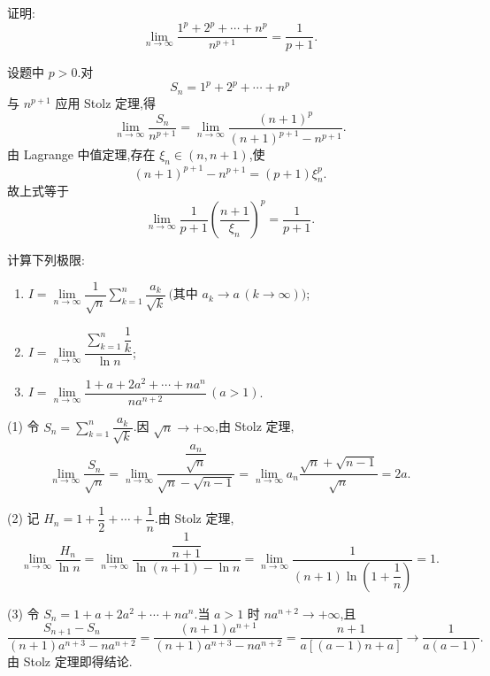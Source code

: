 \begin{example}
  证明:
  \[
    \displaystyle\lim\limits_{n\to\infty}
    \dfrac{1^p+2^p+\cdots+n^p}{n^{p+1}}
    =\dfrac{1}{p+1}.
  \]
\end{example}
\exampleblank

\begin{solution}
  设题中 $p>0$.对
  \[
    S_n=1^p+2^p+\cdots+n^p
  \]
  与 $n^{p+1}$ 应用 Stolz 定理,得
  \[
    \displaystyle\lim\limits_{n\to\infty}\dfrac{S_n}{n^{p+1}}
    =\lim\limits_{n\to\infty}
    \dfrac{(n+1)^p}{(n+1)^{p+1}-n^{p+1}}.
  \]
  由 Lagrange 中值定理,存在 $\xi_n\in(n,n+1)$,使
  \[
    (n+1)^{p+1}-n^{p+1}=(p+1)\xi_n^p.
  \]
  故上式等于
  \[
    \displaystyle\lim\limits_{n\to\infty}\dfrac{1}{p+1}\left(\dfrac{n+1}{\xi_n}\right)^p
    =\dfrac{1}{p+1}.
  \]
\end{solution}

\begin{example}
  计算下列极限:
  \begin{enumerate}
    \item $\displaystyle
            I=\lim\limits_{n\to\infty}\dfrac{1}{\sqrt n}\sum\limits_{k=1}^n\dfrac{a_k}{\sqrt k}
            \,\text{(其中 }a_k\to a\,(k\to\infty)\text{)}$;
    \item $\displaystyle
            I=\lim\limits_{n\to\infty}\dfrac{\displaystyle\sum\limits_{k=1}^n\dfrac{1}{k}}{\ln n}$;
    \item $\displaystyle
            I=\lim\limits_{n\to\infty}\dfrac{1+a+2a^2+\cdots+na^n}{na^{n+2}}
            \,(a>1)$.
  \end{enumerate}
\end{example}
\exampleblank

\begin{solution}

  (1) 令 $S_n=\displaystyle \sum\limits_{k=1}^n \dfrac{a_k}{\sqrt k}$.因 $\sqrt n\to+\infty$,由 Stolz 定理,
  \[
    \displaystyle\lim\limits_{n\to\infty}\dfrac{S_n}{\sqrt n}
    =\lim\limits_{n\to\infty}
    \dfrac{\dfrac{a_n}{\sqrt n}}{\sqrt n-\sqrt{n-1}}
    =\lim\limits_{n\to\infty}a_n\dfrac{\sqrt n+\sqrt{n-1}}{\sqrt n}=2a.
  \]

  (2) 记 $H_n=1+\dfrac{1}{2}+\cdots+\dfrac{1}{n}$.由 Stolz 定理,
  \[
    \displaystyle\lim\limits_{n\to\infty}\dfrac{H_n}{\ln n}
    =\lim\limits_{n\to\infty}
    \dfrac{\dfrac{1}{n+1}}{\ln(n+1)-\ln n}
    =\lim\limits_{n\to\infty}\dfrac{1}{(n+1)\ln\left(1+\dfrac{1}{n}\right)}=1.
  \]

  (3) 令 $S_n=1+a+2a^2+\cdots+na^n$.当 $a>1$ 时
  $na^{n+2}\to+\infty$,且
  \[
    \dfrac{S_{n+1}-S_n}{(n+1)a^{n+3}-na^{n+2}}
    =\dfrac{(n+1)a^{n+1}}{(n+1)a^{n+3}-na^{n+2}}
    =\dfrac{n+1}{a[(a-1)n+a]}
    \longrightarrow\dfrac{1}{a(a-1)}.
  \]
  由 Stolz 定理即得结论.
\end{solution}

